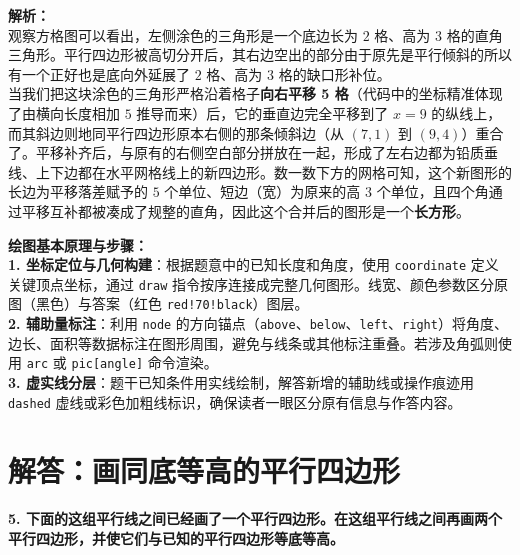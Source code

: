 \vspace{0.6cm}
{\small\color{gray}
\textbf{解析：}\\
观察方格图可以看出，左侧涂色的三角形是一个底边长为 $2$ 格、高为 $3$ 格的直角三角形。平行四边形被高切分开后，其右边空出的部分由于原先是平行倾斜的所以有一个正好也是底向外延展了 $2$ 格、高为 $3$ 格的缺口形补位。\\
当我们把这块涂色的三角形严格沿着格子\textbf{向右平移 5 格}（代码中的坐标精准体现了由横向长度相加 $5$ 推导而来）后，它的垂直边完全平移到了 $x=9$ 的纵线上，而其斜边则地同平行四边形原本右侧的那条倾斜边（从 $(7,1)$ 到 $(9,4)$）重合了。平移补齐后，与原有的右侧空白部分拼放在一起，形成了左右边都为铅质垂线、上下边都在水平网格线上的新四边形。数一数下方的网格可知，这个新图形的长边为平移落差赋予的 $5$ 个单位、短边（宽）为原来的高 $3$ 个单位，且四个角通过平移互补都被凑成了规整的直角，因此这个合并后的图形是一个\textbf{长方形}。
}


\vspace{0.6cm}

{\small\color{blue!70!black}
\textbf{绘图基本原理与步骤：}\\
\textbf{1. 坐标定位与几何构建}：根据题意中的已知长度和角度，使用 \texttt{coordinate} 定义关键顶点坐标，通过 \texttt{draw} 指令按序连接成完整几何图形。线宽、颜色参数区分原图（黑色）与答案（红色 \texttt{red!70!black}）图层。\\
\textbf{2. 辅助量标注}：利用 \texttt{node} 的方向锚点（\texttt{above}、\texttt{below}、\texttt{left}、\texttt{right}）将角度、边长、面积等数据标注在图形周围，避免与线条或其他标注重叠。若涉及角弧则使用 \texttt{arc} 或 \texttt{pic[angle]} 命令渲染。\\
\textbf{3. 虚实线分层}：题干已知条件用实线绘制，解答新增的辅助线或操作痕迹用 \texttt{dashed} 虚线或彩色加粗线标识，确保读者一眼区分原有信息与作答内容。
}

\newpage



\section{解答：画同底等高的平行四边形}

\vspace{0.4cm}

\noindent\textbf{5. 下面的这组平行线之间已经画了一个平行四边形。在这组平行线之间再画两个平行四边形，并使它们与已知的平行四边形等底等高。}

\vspace{0.8cm}

